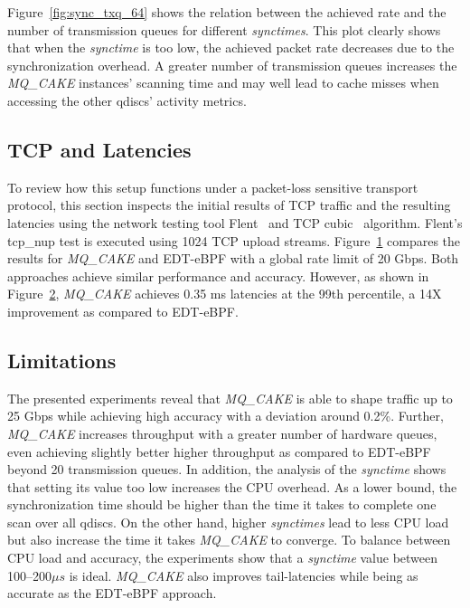 Figure~\ref{fig:sync_txq_64} shows the relation between the achieved rate and the number of transmission queues for different \textit{synctimes}.
%
This plot clearly shows that when the \textit{synctime} is too low, the achieved packet rate decreases due to the synchronization overhead.
%
A greater number of transmission queues increases the \textit{MQ\_CAKE} instances' scanning time and may well lead to cache misses when accessing the other qdiscs' activity metrics.
%

\subsection{TCP and Latencies}
\begin{figure}
    \centering
    
    \caption{}\label{fig:flent_tp}
\end{figure}

\begin{figure}
    \centering
    
    \caption{}\label{fig:flent_ping}
\end{figure}
To review how this setup functions under a packet-loss sensitive transport protocol, this section inspects the initial results of TCP traffic and the resulting latencies using the network testing tool Flent~\cite{flent} and TCP cubic~\cite{tcp-cubic} algorithm.
%
Flent's tcp\_nup test is executed using 1024 TCP upload streams.
%
Figure~\ref{fig:flent_tp} compares the results for \textit{MQ\_CAKE} and EDT-eBPF with a global rate limit of 20 Gbps.
Both approaches achieve similar performance and accuracy.
%
However, as shown in Figure~\ref{fig:flent_ping}, \textit{MQ\_CAKE} achieves 0.35 ms latencies at the 99th percentile, a 14X improvement as compared to EDT-eBPF.
%

\subsection{Limitations}
The presented experiments reveal that \textit{MQ\_CAKE} is able to shape traffic up to 25 Gbps while achieving high accuracy with a deviation around 0.2\%.
%
Further, \textit{MQ\_CAKE} increases throughput with a greater number of hardware queues, even achieving slightly better higher throughput as compared to EDT-eBPF beyond 20 transmission queues.
%
In addition, the analysis of the \textit{synctime} shows that setting its value too low increases the CPU overhead.
%
As a lower bound, the synchronization time should be higher than the time it takes to complete one scan over all qdiscs.
%
On the other hand, higher \textit{synctimes} lead to less CPU load but also increase the time it takes \textit{MQ\_CAKE} to converge.
%
To balance between CPU load and accuracy, the experiments show that a \textit{synctime} value between 100--200$\mu s$ is ideal.
\textit{MQ\_CAKE} also improves tail-latencies while being as accurate as the EDT-eBPF approach.

